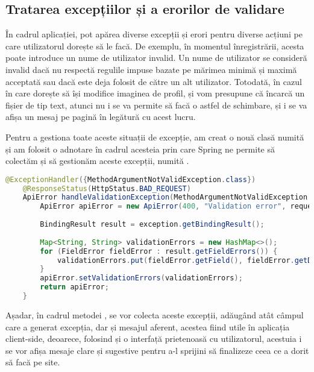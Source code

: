 \subsection{Tratarea excepțiilor și a erorilor de validare}

În cadrul aplicației, pot apărea diverse excepții și erori pentru diverse acțiuni pe care utilizatorul dorește să le facă. De exemplu, în momentul înregistrării, acesta poate introduce un nume de utilizator invalid. Un nume de utilizator se consideră invalid dacă nu respectă regulile impuse bazate pe mărimea minimă și maximă acceptată sau dacă este deja folosit de către un alt utilizator. Totodată, în cazul în care dorește să își modifice imaginea de profil, și vom presupune că încarcă un fișier de tip text, atunci nu i se va permite să facă o astfel de schimbare, și i se va afișa un mesaj pe pagină în legătură cu acest lucru.\newline

Pentru a gestiona toate aceste situații de excepție, am creat o nouă clasă numită  și am folosit o adnotare în cadrul acesteia prin care Spring ne permite să colectăm și să gestionăm aceste excepții, numită .\newline

\begin{lstlisting}[language=Java]
	@ExceptionHandler({MethodArgumentNotValidException.class})
	@ResponseStatus(HttpStatus.BAD_REQUEST)
	ApiError handleValidationException(MethodArgumentNotValidException exception, HttpServletRequest request) {
		ApiError apiError = new ApiError(400, "Validation error", request.getServletPath());
		
		BindingResult result = exception.getBindingResult();
		
		Map<String, String> validationErrors = new HashMap<>();
		for (FieldError fieldError : result.getFieldErrors()) {
			validationErrors.put(fieldError.getField(), fieldError.getDefaultMessage());
		}
		apiError.setValidationErrors(validationErrors);
		return apiError;
	}
\end{lstlisting}
\bigskip

Așadar, în cadrul metodei , se vor colecta aceste excepții, adăugând atât câmpul care a generat excepția, dar și mesajul aferent, acestea fiind utile în aplicația client-side, deoarece, folosind și o interfață prietenoasă cu utilizatorul, acestuia i se vor afișa mesaje clare și sugestive pentru a-l sprijini să finalizeze ceea ce a dorit să facă pe site.\newline

